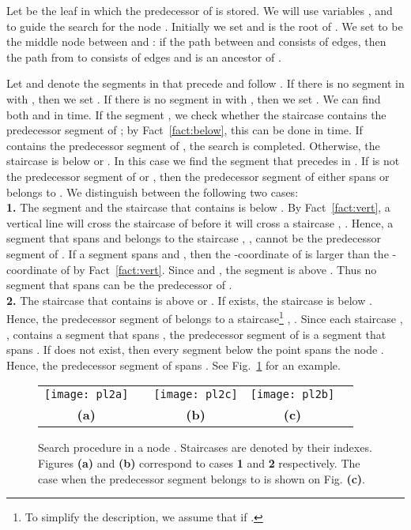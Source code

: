 \documentclass[10pt]{llncs}
\begin{document}
Let  be the leaf in which the predecessor of  is stored. 
We will use variables ,  and  to guide the search for the node . 
Initially we set  and   is  the root of . 
We set  to be  the 
middle node between  and : if the path between  and  consists of 
 edges, then the path from  to  consists of  
edges and  is an ancestor of .


Let  and  denote the segments in  that precede and 
follow .
If there is no segment  in  with , then 
we set . 
If there is no segment  in  with , then 
we set . 
We can find both  and  in  time. 
If the segment , we check whether the staircase  
 contains the predecessor segment of ; by Fact~\ref{fact:below}, 
this can be done in  time. 
If  contains the predecessor segment of , 
the search is completed. 
Otherwise, the staircase  is below  or 
. 
In this case we find the segment  that precedes  in . 
If  is not the predecessor segment of  or , 
then the predecessor segment of  either spans  or belongs to . 
We distinguish between the following two cases:\\ 
{\bf 1.} The segment   and the staircase that contains  is
 below . By Fact~\ref{fact:vert}, a vertical line 
 will cross the staircase of  before it will cross 
a staircase , . Hence, a segment that spans  and 
belongs to the staircase , , cannot 
be the predecessor segment of . If a segment  spans  and 
, then the -coordinate of  is larger than the 
-coordinate of  by Fact~\ref{fact:vert}. Since  and 
,
the segment  is above . 
Thus no segment that spans  can be the predecessor 
of . \\
{\bf 2.} The staircase that contains  is above  or . 
If  exists, the staircase 
  is below . Hence, the predecessor segment of  
belongs  to a staircase\footnote{To simplify the description,
 we assume that  if .} 
, .
Since each staircase , , 
 contains a segment that spans , the predecessor segment of  is 
a segment that spans . 
If  does not exist, then every segment below the point  spans 
the node . Hence, the predecessor segment of  spans .
See Fig.~\ref{fig:pl} for an example.

\begin{figure}[tb]
  \centering
  \begin{tabular}{ccccc}
  \texttt{[image: pl2a]} & \hspace*{.2cm} &
  \texttt{[image: pl2c]} & \hspace*{.2cm} 
  \texttt{[image: pl2b]}  \\
  {\bf (a)}   &  & {\bf(b)} &  {\bf (c)} \\
  \end{tabular}
  \caption{Search procedure in a node . 
    Staircases are denoted by their indexes. 
    Figures {\bf (a)} and  {\bf (b)} correspond to cases {\bf 1} and {\bf 2} 
    respectively. The case when the predecessor segment belongs to 
     is shown on Fig. {\bf (c)}.
     }
  \label{fig:pl}
\end{figure} 
\end{document}
